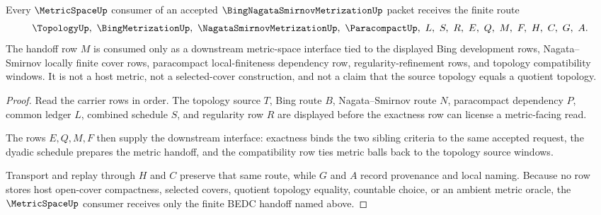 \begin{theorem}
\label{thm:bing-nagata-smirnov-metrization-handoff}
Every $\MetricSpaceUp$ consumer of an accepted $\BingNagataSmirnovMetrizationUp$ packet receives the finite route
$$
\TopologyUp,\ \BingMetrizationUp,\ \NagataSmirnovMetrizationUp,\ \ParacompactUp,\ L,\ S,\ R,\ E,\ Q,\ M,\ F,\ H,\ C,\ G,\ A .
$$
The handoff row $M$ is consumed only as a downstream metric-space interface tied to the displayed Bing development rows, Nagata--Smirnov locally finite cover rows, paracompact local-finiteness dependency row, regularity-refinement rows, and topology compatibility windows. It is not a host metric, not a selected-cover construction, and not a claim that the source topology equals a quotient topology.
\end{theorem}
\begin{proof}
Read the carrier rows in order. The topology source $T$, Bing route $B$, Nagata--Smirnov route $N$, paracompact dependency $P$, common ledger $L$, combined schedule $S$, and regularity row $R$ are displayed before the exactness row can license a metric-facing read.

The rows $E,Q,M,F$ then supply the downstream interface: exactness binds the two sibling criteria to the same accepted request, the dyadic schedule prepares the metric handoff, and the compatibility row ties metric balls back to the topology source windows.

Transport and replay through $H$ and $C$ preserve that same route, while $G$ and $A$ record provenance and local naming. Because no row stores host open-cover compactness, selected covers, quotient topology equality, countable choice, or an ambient metric oracle, the $\MetricSpaceUp$ consumer receives only the finite BEDC handoff named above.
\end{proof}

